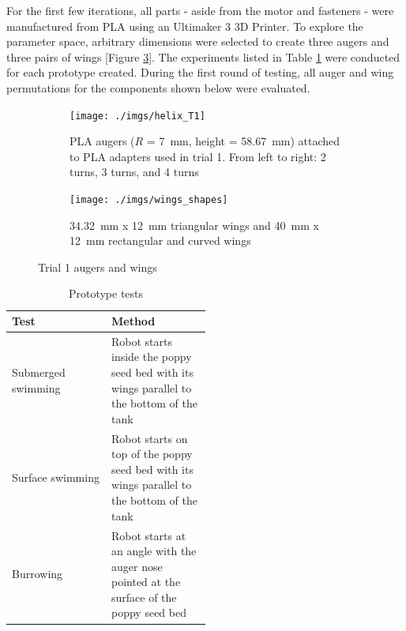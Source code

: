 \documentclass[letterpaper, 11 pt]{article}
\begin{document}
For the first few iterations, all parts - aside from the motor and fasteners - were manufactured from PLA using an Ultimaker 3 3D Printer. To explore the parameter space, arbitrary dimensions were selected to create three augers and three pairs of wings [Figure \ref{fig:trial1}]. The experiments listed in Table \ref{tests} were conducted for each prototype created. During the first round of testing, all auger and wing permutations for the components shown below were evaluated.   
\begin{figure}[H]
\captionsetup[subfigure]{width=0.9\textwidth}
\centering
\begin{subfigure}{.5\textwidth}
	\centering
	\texttt{[image: ./imgs/helix\_T1]}
	\caption{PLA augers ($R$ = \SI{7}{\milli\m}, height = \SI{58.67}{\milli\m}) attached to PLA adapters used in trial 1. From left to right: 2 turns, 3 turns, and 4 turns}
	\label{fig:helix_T1}
\end{subfigure}%
\begin{subfigure}{.5\textwidth}
	\centering
	\texttt{[image: ./imgs/wings\_shapes]}
	\caption{\SI{34.32}{\milli\m} x \SI{12}{\milli\m} triangular wings and \SI{40}{\milli\m} x \SI{12}{\milli\m} rectangular and curved wings}
	\label{fig:wings_shapes}
\end{subfigure}
\caption{Trial 1 augers and wings}
\label{fig:trial1}
\end{figure} 

\begin{table}[H] 
\centering
\caption{Prototype tests}
	\begin{tabular}{l|p{0.5\linewidth}}
	\textbf{Test} & \textbf{Method} \\
	\hline
	Submerged swimming & Robot starts inside the poppy seed bed with its wings parallel to the bottom of the tank\\
	Surface swimming & Robot starts on top of the poppy seed bed with its wings parallel to the bottom of the tank\\
	Burrowing & Robot starts at an angle with the auger nose pointed at the surface of the poppy seed bed\\
	\end{tabular}
	\label{tests}
\end{table}
\end{document}
